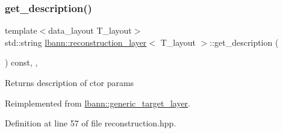 \subsubsection{\texorpdfstring{get\+\_\+description()}{get\_description()}}
{\footnotesize\ttfamily template$<$data\+\_\+layout T\+\_\+layout$>$ \\
std\+::string \hyperlink{classlbann_1_1reconstruction__layer}{lbann\+::reconstruction\+\_\+layer}$<$ T\+\_\+layout $>$\+::get\+\_\+description (\begin{DoxyParamCaption}{ }\end{DoxyParamCaption}) const\hspace{0.3cm}{\ttfamily [inline]}, {\ttfamily [override]}, {\ttfamily [virtual]}}

Returns description of ctor params 

Reimplemented from \hyperlink{classlbann_1_1generic__target__layer_aa2db5ccc0bbd40f081c8ff4501f3fc29}{lbann\+::generic\+\_\+target\+\_\+layer}.



Definition at line 57 of file reconstruction.\+hpp.


